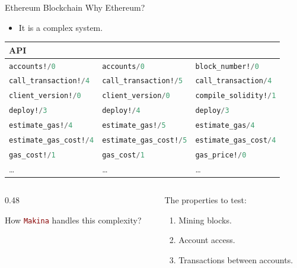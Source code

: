 \documentclass[aspectratio=169, 10pt]{beamer}
\begin{document}
\begin{frame}[label={sec:org3222455},fragile]{Ethereum Blockchain}
 Why Ethereum?
\begin{itemize}
\item It is a complex system.
\end{itemize}
\onslide<+->
\onslide<+->
\begin{center}
\begin{tabular}{lll}
API &  & \\
\hline
\lstinline[language=elixir, style=display]~accounts!/0~ & \lstinline[language=elixir, style=display]~accounts/0~ & \lstinline[language=elixir, style=display]~block_number!/0~\\
\lstinline[language=elixir, style=display]~call_transaction!/4~ & \lstinline[language=elixir, style=display]~call_transaction!/5~ & \lstinline[language=elixir, style=display]~call_transaction/4~\\
\lstinline[language=elixir, style=display]~client_version!/0~ & \lstinline[language=elixir, style=display]~client_version/0~ & \lstinline[language=elixir, style=display]~compile_solidity!/1~\\
\lstinline[language=elixir, style=display]~deploy!/3~ & \lstinline[language=elixir, style=display]~deploy!/4~ & \lstinline[language=elixir, style=display]~deploy/3~\\
\lstinline[language=elixir, style=display]~estimate_gas!/4~ & \lstinline[language=elixir, style=display]~estimate_gas!/5~ & \lstinline[language=elixir, style=display]~estimate_gas/4~\\
\lstinline[language=elixir, style=display]~estimate_gas_cost!/4~ & \lstinline[language=elixir, style=display]~estimate_gas_cost!/5~ & \lstinline[language=elixir, style=display]~estimate_gas_cost/4~\\
\lstinline[language=elixir, style=display]~gas_cost!/1~ & \lstinline[language=elixir, style=display]~gas_cost/1~ & \lstinline[language=elixir, style=display]~gas_price!/0~\\
\ldots{} & \ldots{} & \ldots{}\\
\end{tabular}
\end{center}


\begin{columns}
\begin{column}{0.48\columnwidth}
\onslide<+->

How \lstinline[language=elixir, style=display]~Makina~ handles this complexity?
\end{column}

\begin{column}{0.48\columnwidth}
The properties to test:
\begin{enumerate}
\item Mining blocks.
\item Account access.
\item Transactions between accounts.
\end{enumerate}
\end{column}
\end{columns}
\end{frame}
\end{document}
